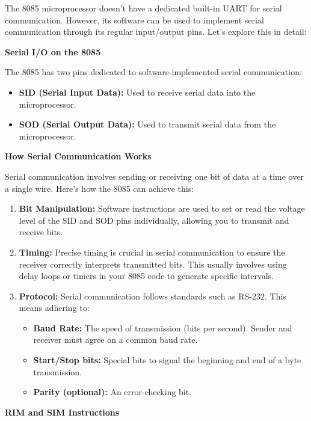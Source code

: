 \documentclass[
]{article}
\begin{document}
The 8085 microprocessor doesn't have a dedicated built-in UART for
serial communication. However, its software can be used to implement
serial communication through its regular input/output pins. Let's
explore this in detail:

\textbf{Serial I/O on the 8085}

The 8085 has two pins dedicated to software-implemented serial
communication:

\begin{itemize}
\item
  \textbf{SID (Serial Input Data):} Used to receive serial data into the
  microprocessor.
\item
  \textbf{SOD (Serial Output Data):} Used to transmit serial data from
  the microprocessor.
\end{itemize}

\textbf{How Serial Communication Works}

Serial communication involves sending or receiving one bit of data at a
time over a single wire. Here's how the 8085 can achieve this:

\begin{enumerate}
\def\labelenumi{\arabic{enumi}.}
\item
  \textbf{Bit Manipulation:} Software instructions are used to set or
  read the voltage level of the SID and SOD pins individually, allowing
  you to transmit and receive bits.
\item
  \textbf{Timing:} Precise timing is crucial in serial communication to
  ensure the receiver correctly interprets transmitted bits. This
  usually involves using delay loops or timers in your 8085 code to
  generate specific intervals.
\item
  \textbf{Protocol:} Serial communication follows standards such as
  RS-232. This means adhering to:

  \begin{itemize}
  \item
    \textbf{Baud Rate:} The speed of transmission (bits per second).
    Sender and receiver must agree on a common baud rate.
  \item
    \textbf{Start/Stop bits:} Special bits to signal the beginning and
    end of a byte transmission.
  \item
    \textbf{Parity (optional):} An error-checking bit.
  \end{itemize}
\end{enumerate}

\textbf{RIM and SIM Instructions}
\end{document}
